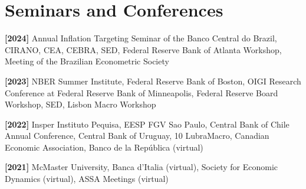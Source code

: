 \documentclass[11pt,letterpaper]{article}
\renewenvironment{itemize}{
  \begin{list}{}{
      \setlength{\leftmargin}{1.5em}
      \setlength{\itemsep}{0.25em}
      \setlength{\parskip}{0pt}
      \setlength{\parsep}{0.25em}
    }
}{
  \end{list}
}
\begin{document}

\section*{Seminars and Conferences}\begin{itemize} 
    \item \textbf{[2024]} Annual Inflation Targeting Seminar of the Banco Central do Brazil, CIRANO, CEA, CEBRA, SED, Federal Reserve Bank of Atlanta Workshop, Meeting of the Brazilian Econometric Society
    \item \textbf{[2023]} NBER Summer Institute,  Federal Reserve Bank of Boston,  OIGI Research Conference at Federal Reserve Bank of Minneapolis, Federal Reserve Board Workshop, SED, Lisbon Macro Workshop
    \item \textbf{[2022]} Insper Instituto Pequisa, EESP FGV Sao Paulo, Central Bank of Chile Annual Conference, Central Bank of Uruguay, 10 LubraMacro, Canadian Economic Association, Banco de la República (virtual) 
    \item \textbf{[2021]} McMaster University, Banca d'Italia (virtual), Society for Economic Dynamics (virtual), ASSA Meetings (virtual)

\end{itemize}



\iffalse
\end{document}
